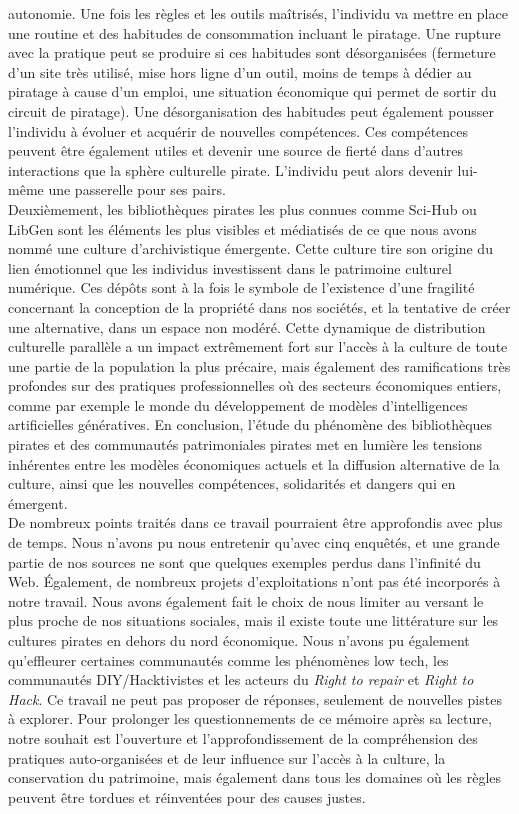 autonomie. Une fois les règles et les outils maîtrisés, l'individu va mettre en place une routine et des habitudes de consommation incluant le piratage. Une rupture avec la pratique peut se produire si ces habitudes sont désorganisées (fermeture d'un site très utilisé, mise hors ligne d'un outil, moins de temps à dédier au piratage à cause d'un emploi, une situation économique qui permet de sortir du circuit de piratage). Une désorganisation des habitudes peut également pousser l'individu à évoluer et acquérir de nouvelles compétences. Ces compétences peuvent être également utiles et devenir une source de fierté dans d'autres interactions que la sphère culturelle pirate. L'individu peut alors devenir lui-même une passerelle pour ses pairs. \\

Deuxièmement, les bibliothèques pirates les plus connues comme Sci-Hub ou LibGen sont les éléments les plus visibles et médiatisés de ce que nous avons nommé une culture d'archivistique émergente. Cette culture tire son origine du lien émotionnel que les individus investissent dans le patrimoine culturel numérique. Ces dépôts sont à la fois le symbole de l'existence d'une fragilité concernant la conception de la propriété dans nos sociétés, et la tentative de créer une alternative, dans un espace non modéré. Cette dynamique de distribution culturelle parallèle a un impact extrêmement fort sur l'accès à la culture de toute une partie de la population la plus précaire, mais également des ramifications très profondes sur des pratiques professionnelles où des secteurs économiques entiers, comme par exemple le monde du développement de modèles d'intelligences artificielles génératives. En conclusion, l'étude du phénomène des bibliothèques pirates et des communautés patrimoniales pirates met en lumière les tensions inhérentes entre les modèles économiques actuels et la diffusion alternative de la culture, ainsi que les nouvelles compétences, solidarités et dangers qui en émergent.\\

De nombreux points traités dans ce travail pourraient être approfondis avec plus de temps. Nous n'avons pu nous entretenir qu'avec cinq enquêtés, et une grande partie de nos sources ne sont que quelques exemples perdus dans l'infinité du Web. Également, de nombreux projets d'exploitations n'ont pas été incorporés à notre travail. Nous avons également fait le choix de nous limiter au versant le plus proche de nos situations sociales, mais il existe toute une littérature sur les cultures pirates en dehors du nord économique. Nous n'avons pu également qu'effleurer certaines communautés comme les phénomènes low tech, les communautés DIY/Hacktivistes et les acteurs du \textit{Right to repair} et \textit{Right to Hack}. Ce travail ne peut pas proposer de réponses, seulement de nouvelles pistes à explorer. Pour prolonger les questionnements de ce mémoire après sa lecture, notre souhait est l'ouverture et l'approfondissement de la compréhension des pratiques auto-organisées et de leur influence sur l'accès à la culture, la conservation du patrimoine, mais également dans tous les domaines où les règles peuvent être tordues et réinventées pour des causes justes.  
